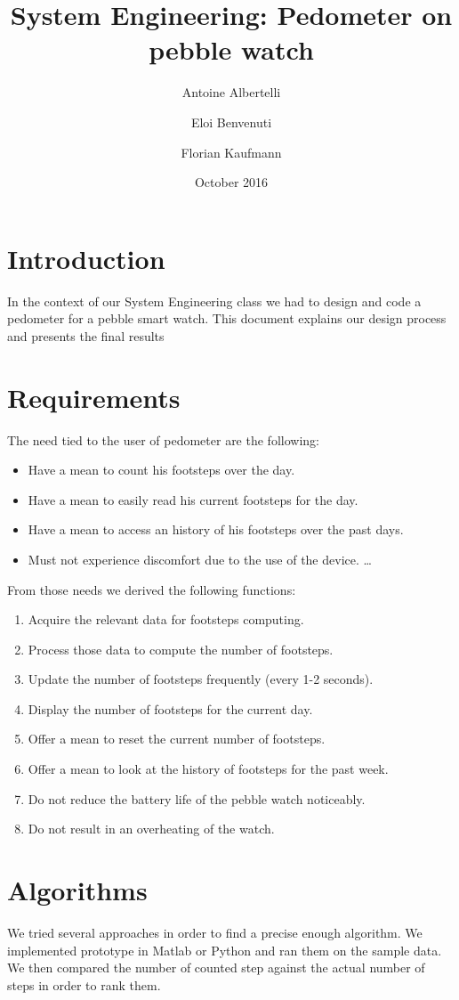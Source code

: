 \documentclass[12pt,twoside,a4paper]{article}
\title{System Engineering: Pedometer on pebble watch}
\author{Antoine Albertelli \and Eloi Benvenuti \and Florian Kaufmann}
\date{October 2016}
\begin{document}
\maketitle

\section{Introduction}
In the context of our System Engineering class we had to design and code a pedometer for a pebble smart	watch. This document explains our design process and presents the final results
\section{Requirements}
The need tied to the user of pedometer are the following:
\begin{itemize}
	\item Have a mean to count his footsteps over the day.
	\item Have a mean to easily read his current footsteps for the day.
	\item Have a mean to access an history of his footsteps over the past days.
	\item Must not experience discomfort due to the use of the device.  \ldots
\end{itemize}

From those needs we derived the following functions:
\begin{enumerate}
	\item Acquire the relevant data for footsteps computing.
	\item Process those data to compute the number of footsteps.
	\item Update the number of footsteps frequently (every 1-2 seconds).
	\item Display the number of footsteps for the current day.
	\item Offer a mean to reset the current number of footsteps.
	\item Offer a mean to look at the history of footsteps for the past week.
	\item Do not reduce the battery life of the pebble watch noticeably.
	\item Do not result in an overheating of the watch.
\end{enumerate}

\section{Algorithms}
We tried several approaches in order to find a precise enough algorithm.
We implemented prototype in Matlab or Python and ran them on the sample data.
We then compared the number of counted step against the actual number of steps in order to rank them.
\end{document}
